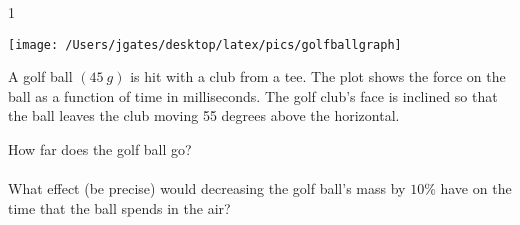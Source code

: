 
\AddToShipoutPicture*{\BackgroundPic}

\addtocounter {ProbNum} {1}

\begin{floatingfigure}[r]{.32\textwidth}
\texttt{[image: /Users/jgates/desktop/latex/pics/golfballgraph]}
\end{floatingfigure}
 
{\bf \Large{}} A golf ball $(45~g)$ is hit with a club from a tee. The plot shows the force on the ball as a function of time in milliseconds. The golf club's face is inclined so that the ball leaves the club moving 55 degrees above the horizontal.

\bigskip
How far does the golf ball go?\paragraph{}
\noindent
\vfill

What effect (be precise) would decreasing the golf ball's mass by $10\%$ have on the time that the ball spends in the air?
\vfill
\newpage